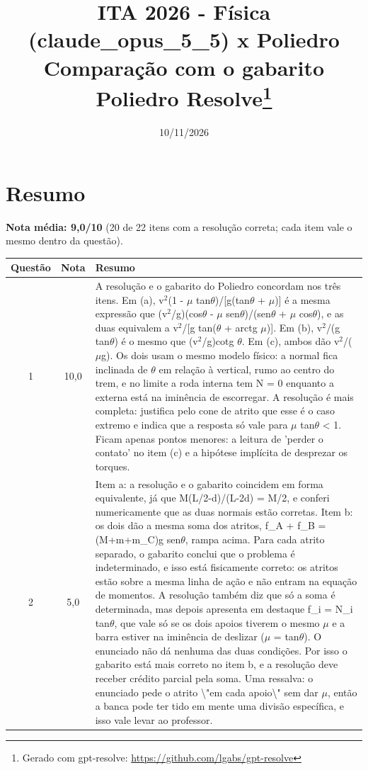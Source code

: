 \documentclass{article}%
\title{ITA 2026 {-} Física (claude\_opus\_5\_5) x Poliedro\\[4pt]\large Comparação com o gabarito Poliedro Resolve\thanks{Gerado com gpt-resolve: \url{https://github.com/lgabs/gpt-resolve}}}%
\date{10/11/2026}%
\begin{document}
%
\normalsize%
\maketitle%
\section*{Resumo}\textbf{Nota média: 9,0/10} (20 de 22 itens com a resolução correta; cada item vale o mesmo dentro da questão).\par\medskip%
\begin{longtable}{@{}c c p{}@{}}\toprule Questão & Nota & Resumo \\ \midrule
1 & 10,0 & A resolução e o gabarito do Poliedro concordam nos três itens. Em (a), v$^2$(1 - $\mu$ tan$\theta$)/{[}g(tan$\theta$ + $\mu$){]} é a mesma expressão que (v$^2$/g)(cos$\theta$ - $\mu$ sen$\theta$)/(sen$\theta$ + $\mu$ cos$\theta$), e as duas equivalem a v$^2$/{[}g tan($\theta$ + arctg $\mu$){]}. Em (b), v$^2$/(g tan$\theta$) é o mesmo que (v$^2$/g)cotg $\theta$. Em (c), ambos dão v$^2$/($\mu$g). Os dois usam o mesmo modelo físico: a normal fica inclinada de $\theta$ em relação à vertical, rumo ao centro do trem, e no limite a roda interna tem N = 0 enquanto a externa está na iminência de escorregar. A resolução é mais completa: justifica pelo cone de atrito que esse é o caso extremo e indica que a resposta só vale para $\mu$ tan$\theta$ < 1. Ficam apenas pontos menores: a leitura de 'perder o contato' no item (c) e a hipótese implícita de desprezar os torques. \\
2 & 5,0 & Item a: a resolução e o gabarito coincidem em forma equivalente, já que M(L/2-d)/(L-2d) = M/2, e conferi numericamente que as duas normais estão corretas. Item b: os dois dão a mesma soma dos atritos, f\_A + f\_B = (M+m+m\_C)g sen$\theta$, rampa acima. Para cada atrito separado, o gabarito conclui que o problema é indeterminado, e isso está fisicamente correto: os atritos estão sobre a mesma linha de ação e não entram na equação de momentos. A resolução também diz que só a soma é determinada, mas depois apresenta em destaque f\_i = N\_i tan$\theta$, que vale só se os dois apoios tiverem o mesmo $\mu$ e a barra estiver na iminência de deslizar ($\mu$ = tan$\theta$). O enunciado não dá nenhuma das duas condições. Por isso o gabarito está mais correto no item b, e a resolução deve receber crédito parcial pela soma. Uma ressalva: o enunciado pede o atrito \textbackslash{}"em cada apoio\textbackslash{}" sem dar $\mu$, então a banca pode ter tido em mente uma divisão específica, e isso vale levar ao professor. \\

\end{longtable}
\end{document}
